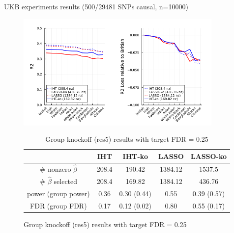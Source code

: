 \documentclass[aspectratio=169, 10pt]{beamer}
\begin{document}
\begin{frame}{UKB experiments results (500/29481 SNPs causal, n=10000)}
    \begin{minipage}[b]{0.65\linewidth}
        \begin{figure}
            \centering
            \includegraphics[width=0.9\textwidth]{figures/k500_n10000.png}
            \begin{table}[]
                \centering
                \small
                \begin{tabular}{c|c|c|c|c}
                & IHT & IHT-ko & LASSO & LASSO-ko\\
                \hline
                 \# nonzero $\hat{\beta}$ & 208.4 & 190.42 & 1384.12 & 1537.5\\
                 \# $\hat{\beta}$ selected & 208.4 & 169.82 & 1384.12 & 436.76\\
                 power  (group power) & 0.36 & 0.30 (0.44) & 0.55 & 0.39 (0.57)\\
                 FDR  (group FDR) & 0.17 & 0.12 (0.02) & 0.80 & 0.55 (0.17)\\
                 \hline
            \end{tabular}
            \caption{Group knockoff (res5) results with target FDR = 0.25}
    \end{table}
    \end{figure}
    
    \end{minipage}
    \hspace{0.5cm}
    \begin{minipage}[b]{0.25\linewidth}
    \end{minipage}
\end{frame}
\end{document}
